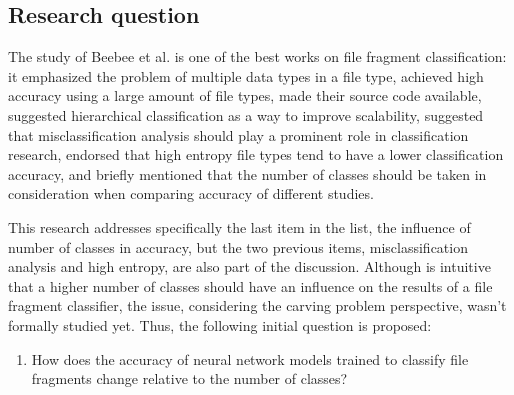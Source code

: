 \subsection{Research question}

The study of Beebee et al. \cite{beebe_sceadan:_2013} is one of the best works on file fragment classification: it emphasized the problem of multiple data types in a file type, achieved high accuracy using a large amount of file types, made their source code available, suggested hierarchical classification as a way to improve scalability, suggested that misclassification analysis should play a prominent role in classification research, endorsed that high entropy file types tend to have a lower classification accuracy, and briefly mentioned that the number of classes should be taken in consideration when comparing accuracy of different studies.

This research addresses specifically the last item in the list, the influence of number of classes in accuracy, but the two previous items, misclassification analysis and high entropy, are also part of the discussion. Although is intuitive that a higher number of classes should have an influence on the results of a file fragment classifier, the issue, considering the carving problem perspective, wasn't formally studied yet. Thus, the following initial question is proposed:

\begin{enumerate}[itemindent=\parindent,label=\textbf{Q\arabic*.}]

    \item How does the accuracy of neural network models trained to classify file fragments change relative to the number of classes?

\end{enumerate}


